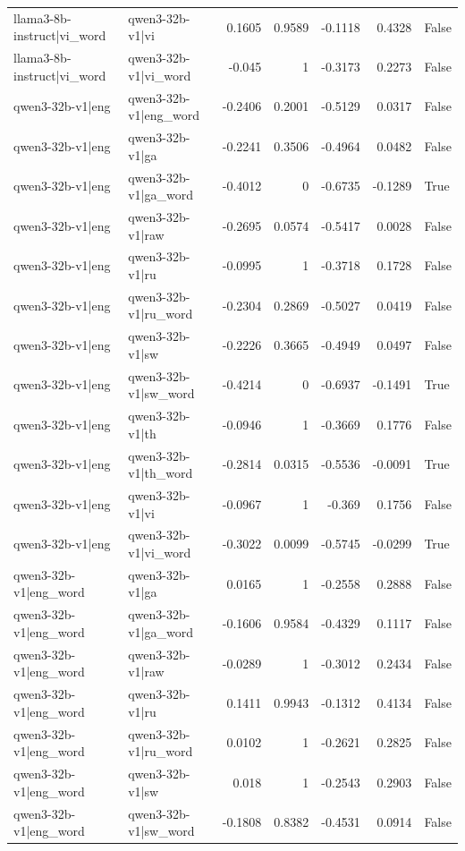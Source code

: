 \begin{table}
\begin{tabular}{l l r r r r l}
llama3-8b-instruct|vi_word & qwen3-32b-v1|vi & 0.1605 & 0.9589 & -0.1118 & 0.4328 & False \\
llama3-8b-instruct|vi_word & qwen3-32b-v1|vi_word & -0.045 & 1 & -0.3173 & 0.2273 & False \\
qwen3-32b-v1|eng & qwen3-32b-v1|eng_word & -0.2406 & 0.2001 & -0.5129 & 0.0317 & False \\
qwen3-32b-v1|eng & qwen3-32b-v1|ga & -0.2241 & 0.3506 & -0.4964 & 0.0482 & False \\
qwen3-32b-v1|eng & qwen3-32b-v1|ga_word & -0.4012 & 0 & -0.6735 & -0.1289 & True \\
qwen3-32b-v1|eng & qwen3-32b-v1|raw & -0.2695 & 0.0574 & -0.5417 & 0.0028 & False \\
qwen3-32b-v1|eng & qwen3-32b-v1|ru & -0.0995 & 1 & -0.3718 & 0.1728 & False \\
qwen3-32b-v1|eng & qwen3-32b-v1|ru_word & -0.2304 & 0.2869 & -0.5027 & 0.0419 & False \\
qwen3-32b-v1|eng & qwen3-32b-v1|sw & -0.2226 & 0.3665 & -0.4949 & 0.0497 & False \\
qwen3-32b-v1|eng & qwen3-32b-v1|sw_word & -0.4214 & 0 & -0.6937 & -0.1491 & True \\
qwen3-32b-v1|eng & qwen3-32b-v1|th & -0.0946 & 1 & -0.3669 & 0.1776 & False \\
qwen3-32b-v1|eng & qwen3-32b-v1|th_word & -0.2814 & 0.0315 & -0.5536 & -0.0091 & True \\
qwen3-32b-v1|eng & qwen3-32b-v1|vi & -0.0967 & 1 & -0.369 & 0.1756 & False \\
qwen3-32b-v1|eng & qwen3-32b-v1|vi_word & -0.3022 & 0.0099 & -0.5745 & -0.0299 & True \\
qwen3-32b-v1|eng_word & qwen3-32b-v1|ga & 0.0165 & 1 & -0.2558 & 0.2888 & False \\
qwen3-32b-v1|eng_word & qwen3-32b-v1|ga_word & -0.1606 & 0.9584 & -0.4329 & 0.1117 & False \\
qwen3-32b-v1|eng_word & qwen3-32b-v1|raw & -0.0289 & 1 & -0.3012 & 0.2434 & False \\
qwen3-32b-v1|eng_word & qwen3-32b-v1|ru & 0.1411 & 0.9943 & -0.1312 & 0.4134 & False \\
qwen3-32b-v1|eng_word & qwen3-32b-v1|ru_word & 0.0102 & 1 & -0.2621 & 0.2825 & False \\
qwen3-32b-v1|eng_word & qwen3-32b-v1|sw & 0.018 & 1 & -0.2543 & 0.2903 & False \\
qwen3-32b-v1|eng_word & qwen3-32b-v1|sw_word & -0.1808 & 0.8382 & -0.4531 & 0.0914 & False \\

\end{tabular}
\end{table}
